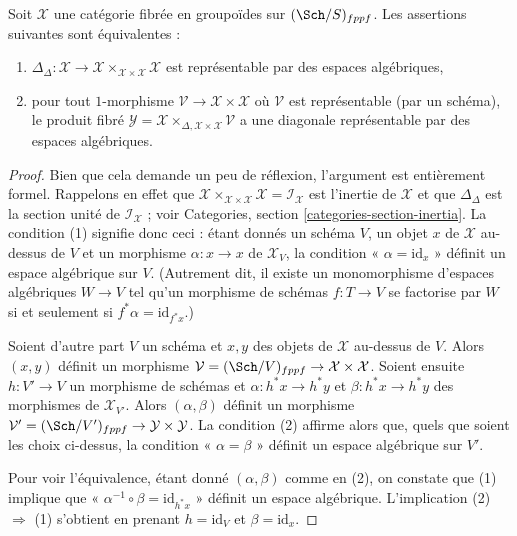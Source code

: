 \begin{lemma}
\label{lemma-second-diagonal}
Soit $\mathcal{X}$ une catégorie fibrée en groupoïdes sur $(\Sch/S)_{fppf}$.
Les assertions suivantes sont équivalentes :
\begin{enumerate}
\item $\Delta_\Delta : \mathcal{X} \to
\mathcal{X} \times_{\mathcal{X} \times \mathcal{X}} \mathcal{X}$
est représentable par des espaces algébriques,
\item pour tout $1$-morphisme $\mathcal{V} \to \mathcal{X} \times \mathcal{X}$
où $\mathcal{V}$ est représentable (par un schéma), le produit fibré
$\mathcal{Y} =
\mathcal{X} \times_{\Delta, \mathcal{X} \times \mathcal{X}} \mathcal{V}$
a une diagonale représentable par des espaces algébriques.
\end{enumerate}
\end{lemma}

\begin{proof}
Bien que cela demande un peu de réflexion, l'argument est entièrement formel.
Rappelons en effet que
$\mathcal{X} \times_{\mathcal{X} \times \mathcal{X}} \mathcal{X} =
\mathcal{I}_\mathcal{X}$ est l'inertie de $\mathcal{X}$ et que
$\Delta_\Delta$ est la section unité de $\mathcal{I}_\mathcal{X}$ ; voir
Categories, section \ref{categories-section-inertia}.
La condition (1) signifie donc ceci : étant donnés un schéma $V$, un objet $x$ de
$\mathcal{X}$ au-dessus de $V$ et un morphisme $\alpha : x \to x$ de $\mathcal{X}_V$,
la condition « $\alpha = \text{id}_x$ » définit un espace algébrique sur $V$.
(Autrement dit, il existe un monomorphisme d'espaces algébriques $W \to V$
tel qu'un morphisme de schémas $f : T \to V$ se factorise par $W$
si et seulement si $f^*\alpha = \text{id}_{f^*x}$.)

\medskip\noindent
Soient d'autre part $V$ un schéma et $x, y$ des objets de
$\mathcal{X}$ au-dessus de $V$. Alors $(x, y)$ définit un morphisme
$\mathcal{V} = (\Sch/V)_{fppf} \to \mathcal{X} \times \mathcal{X}$.
Soient ensuite $h : V' \to V$ un morphisme de schémas et
$\alpha : h^*x \to h^*y$ et $\beta : h^*x \to h^*y$ des morphismes
de $\mathcal{X}_{V'}$. Alors $(\alpha, \beta)$ définit un morphisme
$\mathcal{V}' = (\Sch/V')_{fppf} \to \mathcal{Y} \times \mathcal{Y}$.
La condition (2) affirme alors que, quels que soient les choix ci-dessus, la
condition « $\alpha = \beta$ » définit un espace algébrique sur $V'$.

\medskip\noindent
Pour voir l'équivalence, étant donné $(\alpha, \beta)$ comme en (2), on constate que
(1) implique que « $\alpha^{-1} \circ \beta = \text{id}_{h^*x}$ »
définit un espace algébrique. L'implication (2) $\Rightarrow$ (1)
s'obtient en prenant $h = \text{id}_V$ et $\beta = \text{id}_x$.
\end{proof}











